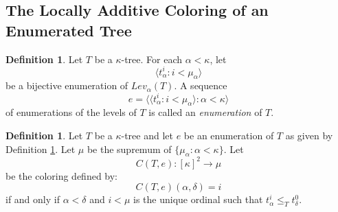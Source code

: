 \documentclass[11pt]{amsart}
\theoremstyle{plain}
\theoremstyle{definition} %
\newtheorem{definition}[theorem]{Definition}
\theoremstyle{remark}
\begin{document}
\subsection{The Locally Additive Coloring of an Enumerated Tree}
\begin{definition}\label{definition enumeration}
Let $T$ be a $\kappa$-tree. For each $\alpha<\kappa$, let
\[
\langle t^i_\alpha:i<\mu_\alpha \rangle
\]
 be a bijective enumeration of $Lev_\alpha(T)$. A sequence
\[
e=\langle \langle t^i_\alpha:i<\mu_\alpha \rangle:\alpha<\kappa \rangle
\]
of enumerations of the levels of $T$
is called an \emph{enumeration} of $T$.
\end{definition}


\begin{definition}\label{definition C(T,e)}
Let $T$ be a $\kappa$-tree and let $e$ be an enumeration of $T$ as given by Definition \ref{definition enumeration}. Let $\mu$ be the supremum of $\{\mu_\alpha:\alpha<\kappa\}$. Let
\[
C(T,e):[\kappa]^2 \to \mu
\]
be the coloring defined by:
\[
C(T,e)(\alpha,\delta)=i
\]
if and only if $\alpha<\delta$ and $i<\mu$ is the unique ordinal such that $t^i_\alpha \leq_T t^0_\delta$.
\end{definition}
\end{document}
